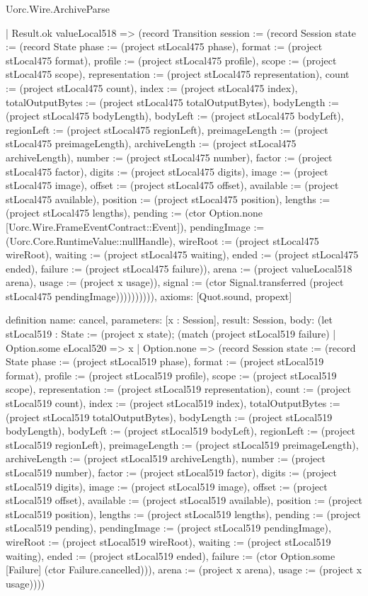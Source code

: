 \begin{lexlean}{Uorc.Wire.ArchiveParse}
\begin{semanticmodule}
{            | Result.ok valueLocal518 => (record Transition {session := (record Session {state := (record State {phase := (project stLocal475 phase), format := (project stLocal475 format), profile := (project stLocal475 profile), scope := (project stLocal475 scope), representation := (project stLocal475 representation), count := (project stLocal475 count), index := (project stLocal475 index), totalOutputBytes := (project stLocal475 totalOutputBytes), bodyLength := (project stLocal475 bodyLength), bodyLeft := (project stLocal475 bodyLeft), regionLeft := (project stLocal475 regionLeft), preimageLength := (project stLocal475 preimageLength), archiveLength := (project stLocal475 archiveLength), number := (project stLocal475 number), factor := (project stLocal475 factor), digits := (project stLocal475 digits), image := (project stLocal475 image), offset := (project stLocal475 offset), available := (project stLocal475 available), position := (project stLocal475 position), lengths := (project stLocal475 lengths), pending := (ctor Option.none [Uorc.Wire.FrameEventContract::Event]), pendingImage := (Uorc.Core.RuntimeValue::nullHandle), wireRoot := (project stLocal475 wireRoot), waiting := (project stLocal475 waiting), ended := (project stLocal475 ended), failure := (project stLocal475 failure)}), arena := (project valueLocal518 arena), usage := (project x usage)}), signal := (ctor Signal.transferred (project stLocal475 pendingImage))})))))))),
  axioms: [Quot.sound, propext]
}

definition{
  name: cancel,
  parameters: [x : Session],
  result: Session,
  body: (let stLocal519 : State := (project x state); (match (project stLocal519 failure)
    | Option.some eLocal520 => x
    | Option.none => (record Session {state := (record State {phase := (project stLocal519 phase), format := (project stLocal519 format), profile := (project stLocal519 profile), scope := (project stLocal519 scope), representation := (project stLocal519 representation), count := (project stLocal519 count), index := (project stLocal519 index), totalOutputBytes := (project stLocal519 totalOutputBytes), bodyLength := (project stLocal519 bodyLength), bodyLeft := (project stLocal519 bodyLeft), regionLeft := (project stLocal519 regionLeft), preimageLength := (project stLocal519 preimageLength), archiveLength := (project stLocal519 archiveLength), number := (project stLocal519 number), factor := (project stLocal519 factor), digits := (project stLocal519 digits), image := (project stLocal519 image), offset := (project stLocal519 offset), available := (project stLocal519 available), position := (project stLocal519 position), lengths := (project stLocal519 lengths), pending := (project stLocal519 pending), pendingImage := (project stLocal519 pendingImage), wireRoot := (project stLocal519 wireRoot), waiting := (project stLocal519 waiting), ended := (project stLocal519 ended), failure := (ctor Option.some [Failure] (ctor Failure.cancelled))}), arena := (project x arena), usage := (project x usage)})))
}


\end{semanticmodule}
\end{lexlean}
